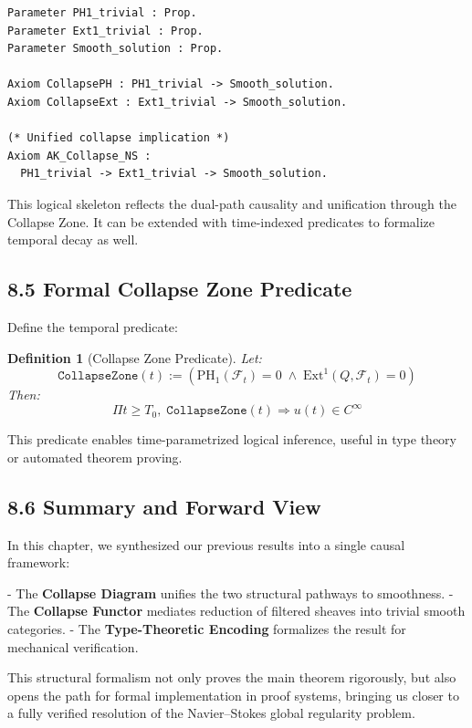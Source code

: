 \documentclass[11pt]{article}
\newtheorem{definition}[theorem]{Definition}
\begin{document}
\begin{lstlisting}[language=Coq, caption=Collapse-based Regularity Encoding in Coq]
Parameter PH1_trivial : Prop.
Parameter Ext1_trivial : Prop.
Parameter Smooth_solution : Prop.

Axiom CollapsePH : PH1_trivial -> Smooth_solution.
Axiom CollapseExt : Ext1_trivial -> Smooth_solution.

(* Unified collapse implication *)
Axiom AK_Collapse_NS :
  PH1_trivial -> Ext1_trivial -> Smooth_solution.
\end{lstlisting}

This logical skeleton reflects the dual-path causality and unification through the Collapse Zone.  
It can be extended with time-indexed predicates to formalize temporal decay as well.

\subsection{8.5 Formal Collapse Zone Predicate}

Define the temporal predicate:

\begin{definition}[Collapse Zone Predicate]
Let:
\[
\texttt{CollapseZone}(t) :=
\left(
\mathrm{PH}_1(\mathcal{F}_t) = 0
\;\land\;
\mathrm{Ext}^1(Q, \mathcal{F}_t) = 0
\right)
\]
Then:
\[
\Pi t \ge T_0,\; \texttt{CollapseZone}(t) \Rightarrow u(t) \in C^\infty
\]
\end{definition}

This predicate enables time-parametrized logical inference,  
useful in type theory or automated theorem proving.

\subsection{8.6 Summary and Forward View}

In this chapter, we synthesized our previous results into a single causal framework:

- The \textbf{Collapse Diagram} unifies the two structural pathways to smoothness.
- The \textbf{Collapse Functor} mediates reduction of filtered sheaves into trivial smooth categories.
- The \textbf{Type-Theoretic Encoding} formalizes the result for mechanical verification.

This structural formalism not only proves the main theorem rigorously,  
but also opens the path for formal implementation in proof systems,  
bringing us closer to a fully verified resolution of the Navier–Stokes global regularity problem.
\end{document}

